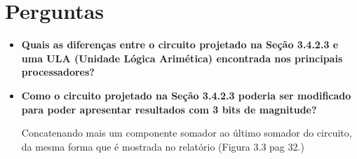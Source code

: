 \documentclass[12pts]{article}
\begin{document}
\section{Perguntas}
\begin{itemize}
	\item \textbf{Quais as diferenças entre o circuito projetado na Seção 3.4.2.3 e uma ULA (Unidade Lógica Arimética) encontrada nos principais processadores?}
	
	
	
	\item \textbf{Como o circuito projetado na Seção 3.4.2.3 poderia ser modificado para poder apresentar resultados com 3 bits de magnitude?}
	
	Concatenando mais um componente somador ao último somador do circuito, da mesma forma que é mostrada no relatório (Figura 3.3 pag 32.)
	
\end{itemize}
\end{document}
